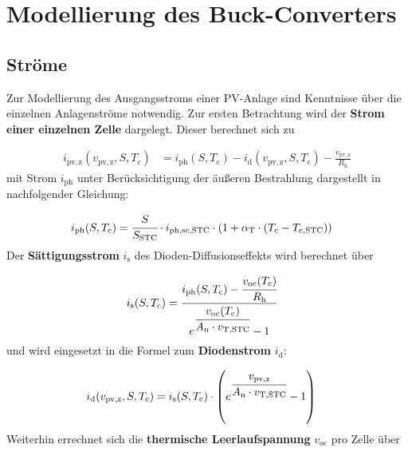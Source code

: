 \section{Modellierung des Buck-Converters} \label{sec:Modellierung}

\subsection{Ströme} \label{sec:Stroeme}

Zur Modellierung des Ausgangsstroms einer PV-Anlage sind Kenntnisse über die einzelnen Anlagenströme notwendig. Zur ersten Betrachtung wird der \textbf{Strom einer einzelnen Zelle} dargelegt. Dieser berechnet sich zu

\begin{align}
    i_{\mathrm{pv,z}}(v_{\mathrm{pv,z}}, S, T_{\mathrm{c}}) &= i_{\mathrm{ph}}(S, T_{\mathrm{c}}) - i_{\mathrm{d}}(v_{\mathrm{pv,z}}, S, T_{\mathrm{c}}) - \frac{v_{\mathrm{pv,z}}}{R_{\mathrm{h}}}
    \label{eq:Gleichung2}
\end{align}
\newline
mit Strom $i_{\mathrm{ph}}$ unter Berücksichtigung der äußeren Bestrahlung dargestellt in nachfolgender Gleichung:

\begin{align*}
    i_{\mathrm{ph}}(S, T_{\mathrm{c}}) &= \cfrac{S}{S_{\mathrm{STC}}}\cdot i_{\mathrm{ph,sc,STC}}\cdot\left(1+\alpha_{\mathrm{T}}\cdot\left(T_{\mathrm{c}}-T_{\mathrm{c,STC}}\right)\right)
\end{align*}
\newline
Der \textbf{Sättigungsstrom} $i_{\mathrm{s}}$ des Dioden-Diffusionseffekts wird berechnet über

\begin{align*}
    i_{\mathrm{s}}(S, T_{\mathrm{c}}) &= \cfrac{i_{\mathrm{ph}}(S, T_{\mathrm{c}})-\cfrac{v_{\mathrm{oc}}(T_{\mathrm{c}})}{R_{\mathrm{h}}}}{e^{\cfrac{v_{\mathrm{oc}}(T_{\mathrm{c}})}{A_{\mathrm{n}}\cdot v_{\mathrm{T,STC}}}}-1}
\end{align*}
\newline
und wird eingesetzt in die Formel zum \textbf{Diodenstrom} $i_{\mathrm{d}}$:

\begin{align*}
    i_{\mathrm{d}}(v_{\mathrm{pv,z}}, S, T_{\mathrm{c}}) &= i_{\mathrm{s}}(S, T_{\mathrm{c}})\cdot \left(e^{\cfrac{v_{\mathrm{pv,z}}}{A_{\mathrm{n}}\cdot v_{\mathrm{T,STC}}}}-1\right)
\end{align*}
\newline
Weiterhin errechnet sich die \textbf{thermische Leerlaufspannung} $v_{\mathrm{oc}}$ pro Zelle über

